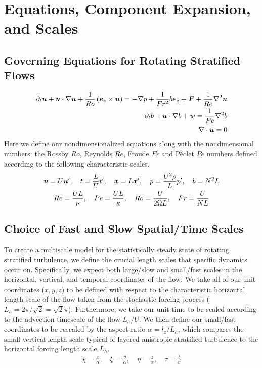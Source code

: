 \documentclass{article}
\begin{document}
\maketitle 

\setlength{\parindent}{0pt}
\section{Equations, Component Expansion, and Scales}

\subsection{Governing Equations for Rotating Stratified Flows}
\begin{align}
    \partial_t \boldsymbol{u} + \boldsymbol{u}\cdot\nabla\boldsymbol{u} + \frac{1}{Ro}\left(\boldsymbol{e}_z \times
    \boldsymbol{u}\right) = - \nabla p + \frac{1}{Fr^2}b\boldsymbol{e}_z + \boldsymbol{F} +
    \frac{1}{Re}\nabla^2\boldsymbol{u} \label{eq:NS}\\
    \partial_t b + \boldsymbol{u}\cdot\nabla b + w = \frac{1}{Pe}\nabla^2b \label{eq:buoy}\\
    \nabla\cdot\boldsymbol{u} = 0 \label{eq:div}
\end{align}
Here we define our nondimensionalized equations along with the
nondimensional numbers: the Rossby $Ro$,
Reynolds $Re$, Froude $Fr$ and P\'eclet $Pe$ numbers defined according to the
following characteristic scales. 
\begin{gather*}
    \boldsymbol{u} = U\boldsymbol{u}',\quad t = \frac{L}{U}t',\quad \boldsymbol{x} = L\boldsymbol{x} ',\quad p = \frac{U^2\rho}{L}p',
    \quad b = N^2L\\
    Re = \frac{UL}{\nu}, \quad Pe = \frac{UL}{\kappa}, \quad Ro =
    \frac{U}{2\Omega L}, \quad Fr = \frac{U}{NL}
\end{gather*}

\subsection{Choice of Fast and Slow Spatial/Time Scales}

To create a multiscale model for the statistically steady state of
rotating stratified turbulence, we define the crucial length scales that
specific dynamics occur on. Specifically, we expect both large/slow and
small/fast scales in the horizontal, vertical, and temporal coordinates of the
flow. We take all of our unit coordinates ($x,y,z$) to be defined with respect to the
characteristic horizontal length scale of the flow taken from the stochastic
forcing process ($L_h = 2\pi/\sqrt{2} = \sqrt{2}\pi$). Furthermore, we take our
unit time to be scaled according to the advection timescale of the flow $L_h/U$.
We then define our
small/fast coordinates to be rescaled by the aspect ratio $\alpha = l_z/L_h$,
which compares the small vertical length scale typical of layered anistropic
stratified turbulence to the horizontal forcing length scale $L_h$. 
\begin{gather*}
    \chi = \frac{x}{\alpha}, \quad \xi = \frac{y}{\alpha}, \quad \eta =
    \frac{z}{\alpha}, \quad \tau = \frac{t}{\alpha}
\end{gather*}
\end{document}
